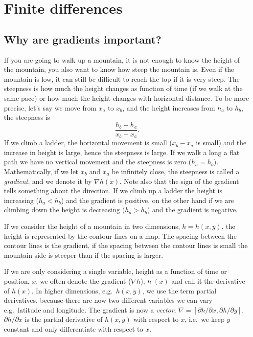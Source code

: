 \documentclass[graybox,sectrefs,envcountresetchap,open=right,final]{svmonodo}
\newenvironment{graybox2admon}[1][]{
\begin{graybox2mdframed}[frametitle=#1]
}
{
\end{graybox2mdframed}
}
\begin{document}
\noindent
\chapter{Finite differences}
\label{ch:taylor}

\section{Why are gradients important?}
If you are going to walk up a mountain, it is not enough to know the height of the mountain, you also want to know how steep the mountain is. Even if the mountain is low, it can still be difficult to reach the top if it is very steep. The steepness is how much the height changes as function of time (if we walk at the same pace) or how much the height changes with horizontal distance. To be more precise, let's say we move from $x_a$ to $x_b$, and the height increases from $h_a$ to $h_b$, the steepness is
\begin{equation}
\frac{h_b-h_a}{x_b-x_a}.
\label{eq:tay:gradb}
\end{equation}
If we climb a ladder, the horizontal movement is small ($x_b-x_a$ is small) and the increase in height is large, hence the steepness is large. If we walk a long a flat path we have no vertical movement and the steepness is zero ($h_a=h_b$). Mathematically, if we let $x_b$ and $x_a$ be infinitely close, the steepness is called a \emph{gradient}, and we denote it by $\nabla h(x)$. Note also that the sign of the gradient tells something about the direction. If we climb up a ladder the height is increasing ($h_a<h_b$) and the gradient is positive, on the other hand if we are climbing down the height is decreasing ($h_a>h_b$) and the gradient is negative. 

If we consider the height of a mountain in two dimensions, $h=h(x,y)$, the height is represented by the contour lines on a map. The spacing between the contour lines is the gradient, if the spacing between the contour lines is small the mountain side is steeper than if the spacing is larger.  



\begin{graybox2admon}[Gradients vs derivatives]
If we are only considering a single variable, height as a function of time or position, $x$, we often denote the gradient ($\nabla h$), $h^\prime(x)$ and call it the derivative of $h(x)$. In higher dimensions, e.g.~$h(x,y)$, we use the term partial derivatives, because there are now two different variables we can vary e.g.~latitude and longitude. The gradient is now a \emph{vector}, $\nabla=[\partial h/\partial x, \partial h/\partial y]$. $\partial h/\partial x$ is the partial derivative of $h(x,y)$ with respect to $x$, i.e.~we keep $y$ constant and only differentiate with respect to $x$.
\end{graybox2admon}
\end{document}
